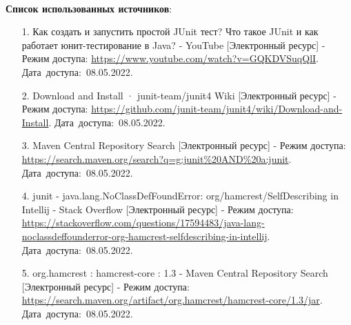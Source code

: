 \documentclass[12pt, a4paper, simple]{eskdtext}
\begin{document}

    \paragraph{} \textbf{Список использованных источников}:
    \begin{enumerate}
        \item[1.] Как создать и запустить простой JUnit тест? Что такое JUnit и как работает юнит-тестирование в Java? - YouTube [Электронный ресурс]
        - Режим доступа: \url{https://www.youtube.com/watch?v=GQKDVSuqQlI}.
        Дата~доступа:~08.05.2022.
        \item[2.] Download and Install · junit-team/junit4 Wiki [Электронный ресурс]
        - Режим доступа: \url{https://github.com/junit-team/junit4/wiki/Download-and-Install}.
        Дата~доступа:~08.05.2022.
        \item[3.] Maven Central Repository Search [Электронный ресурс]
        - Режим доступа: \url{https://search.maven.org/search?q=g:junit%20AND%20a:junit}.
        Дата~доступа:~08.05.2022.
        \item[4.] junit - java.lang.NoClassDefFoundError: org/hamcrest/SelfDescribing in Intellij - Stack Overflow [Электронный ресурс]
        - Режим доступа: \url{https://stackoverflow.com/questions/17594483/java-lang-noclassdeffounderror-org-hamcrest-selfdescribing-in-intellij}.
        Дата~доступа:~08.05.2022.
        \item[5.] org.hamcrest : hamcrest-core : 1.3 - Maven Central Repository Search [Электронный ресурс]
        - Режим доступа: \url{https://search.maven.org/artifact/org.hamcrest/hamcrest-core/1.3/jar}.
        Дата~доступа:~08.05.2022.
    \end{enumerate}
    \newpage
\end{document}
